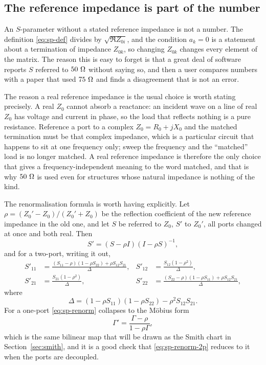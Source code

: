 \subsection{The reference impedance is part of the number}
\label{sec:sp-refz}

An $S$-parameter without a stated reference impedance is not a number. The definition \eqref{eq:sp-def} divides
by $\sqrt{\Re Z_{0i}}$, and the condition $a_k=0$ is a statement about a termination of impedance $Z_{0k}$, so
changing $Z_{0k}$ changes every element of the matrix. The reason this is easy to forget is that a great deal of
software reports $S$ referred to $50\ \Omega$ without saying so, and then a user compares numbers with a paper that
used $75\ \Omega$ and finds a disagreement that is not an error.

The reason a real reference impedance is the usual choice is worth stating precisely. A real $Z_0$ cannot absorb
a reactance: an incident wave on a line of real $Z_0$ has voltage and current in phase, so the load that reflects
nothing is a pure resistance. Reference a port to a complex $Z_0=R_0+jX_0$ and the matched termination must be
that complex impedance, which is a particular circuit that happens to sit at one frequency only; sweep the
frequency and the ``matched'' load is no longer matched. A real reference impedance is therefore the only choice
that gives a frequency-independent meaning to the word matched, and that is why $50\ \Omega$ is used even for
structures whose natural impedance is nothing of the kind.

The renormalisation formula is worth having explicitly. Let $\rho=(Z_0'-Z_0)/(Z_0'+Z_0)$ be the reflection
coefficient of the new reference impedance in the old one, and let $S$ be referred to $Z_0$, $S'$ to $Z_0'$, all
ports changed at once and both real. Then
\begin{equation}
  S' = (S - \rho I)(I - \rho S)^{-1} ,
  \label{eq:sp-renorm}
\end{equation}
and for a two-port, writing it out,
\begin{equation}
  \begin{aligned}
    S'_{11} &= \frac{(S_{11}-\rho)(1-\rho S_{22}) + \rho S_{12}S_{21}}{\Delta}, &
    S'_{12} &= \frac{S_{12}(1-\rho^2)}{\Delta}, \\
    S'_{21} &= \frac{S_{21}(1-\rho^2)}{\Delta}, &
    S'_{22} &= \frac{(S_{22}-\rho)(1-\rho S_{11}) + \rho S_{12}S_{21}}{\Delta},
  \end{aligned}
  \label{eq:sp-renorm-2p}
\end{equation}
where
\begin{equation}
  \Delta = (1-\rho S_{11})(1-\rho S_{22}) - \rho^2 S_{12}S_{21} .
  \label{eq:sp-renorm-delta}
\end{equation}
For a one-port \eqref{eq:sp-renorm} collapses to the M\"obius form
\begin{equation}
  \Gamma' = \frac{\Gamma - \rho}{1 - \rho\Gamma} ,
  \label{eq:sp-renorm-1p}
\end{equation}
which is the same bilinear map that will be drawn as the Smith chart in Section~\ref{sec:smith}, and it is a good
check that \eqref{eq:sp-renorm-2p} reduces to it when the ports are decoupled.

